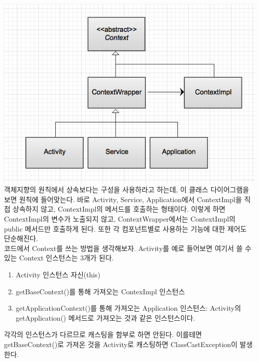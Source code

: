 \includegraphics[scale=0.5]{context}\\
객체지향의 원칙에서 상속보다는 구성을 사용하라고 하는데, 이 클래스 다이어그램을 보면 원칙에 들어맞는다.
바로 Activity, Service, Application에서 ContextImpl을 직접 상속하지 않고, ContextImpl의 메서드를 호출하는 형태이다. 
이렇게 하면 ContextImpl의 변수가 노출되지 않고, ContextWrapper에서는 ContextImpl의 public 메서드만 호출하게 된다. 또한 각 컴포넌트별로 사용하는 기능에 대한 제어도 단순해진다.\\

코드에서 Context를 쓰는 방법을 생각해보자.
Activity를 예로 들어보면 여기서 쓸 수 있는 Context 인스턴스는 3개가 된다. 
\begin{enumerate}
\item Activity 인스턴스 자신(this)
\item getBaseContext()를 통해 가져오는 ContexImpl 인스턴스
\item getApplicationContext()를 통해 가져오는 Application 인스턴스: Activity의 getApplication() 메서드로 가져오는 것과 같은 인스턴스이다.
\end{enumerate}

각각의 인스턴스가 다르므로 캐스팅을 함부로 하면 안된다. 이를테면 getBaseContext()로 가져온 것을 Activity로 캐스팅하면 ClassCastException이 발생한다.\\

